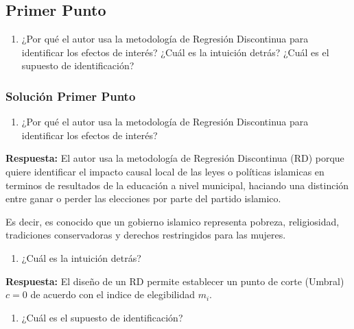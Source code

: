 \documentclass[
]{article}
\providecommand{\tightlist}{%
  \setlength{\itemsep}{0pt}\setlength{\parskip}{0pt}}
\begin{document}
\subsection{Primer Punto}\label{primer-punto}

\begin{enumerate}
\def\labelenumi{\arabic{enumi}.}
\tightlist
\item
  ¿Por qué el autor usa la metodología de Regresión Discontinua para
  identificar los efectos de interés? ¿Cuál es la intuición detrás?
  ¿Cuál es el supuesto de identificación?
\end{enumerate}

\subsubsection{Solución Primer Punto}\label{soluciuxf3n-primer-punto}

\begin{enumerate}
\def\labelenumi{\alph{enumi})}
\tightlist
\item
  ¿Por qué el autor usa la metodología de Regresión Discontinua para
  identificar los efectos de interés?
\end{enumerate}

\textbf{Respuesta:} El autor usa la metodología de Regresión Discontinua
(RD) porque quiere identificar el impacto causal local de las leyes o
políticas islamicas en terminos de resultados de la educación a nivel
municipal, haciando una distinción entre ganar o perder las elecciones
por parte del partido islamico.

Es decir, es conocido que un gobierno islamico representa pobreza,
religiosidad, tradiciones conservadoras y derechos restringidos para las
mujeres.

\begin{enumerate}
\def\labelenumi{\alph{enumi})}
\setcounter{enumi}{1}
\tightlist
\item
  ¿Cuál es la intuición detrás?
\end{enumerate}

\textbf{Respuesta:} El diseño de un RD permite establecer un punto de
corte (Umbral) \(c=0\) de acuerdo con el indice de elegibilidad \(m_i\).

\begin{enumerate}
\def\labelenumi{\alph{enumi})}
\setcounter{enumi}{2}
\tightlist
\item
  ¿Cuál es el supuesto de identificación?
\end{enumerate}
\end{document}
